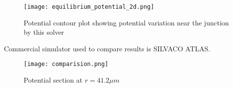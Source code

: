 \documentclass{beamer}
\begin{document}
\begin{frame}
\begin{figure}[h!]
     \centering
        \texttt{[image: equilibrium\_potential\_2d.png]}
         \caption{Potential contour plot showing potential variation near the junction by this solver}
         \label{fig:pot_2d}
     \end{figure}
\end{frame}
%


%
\begin{frame}
Commercial simulator used to compare results is SILVACO ATLAS.
\begin{figure}[h!]
     \centering
        \texttt{[image: comparision.png]}
         \caption{Potential section at $r=41.2 \mu m$}
         \label{fig:pot_sec}
     \end{figure}
\end{frame}
\end{document}
